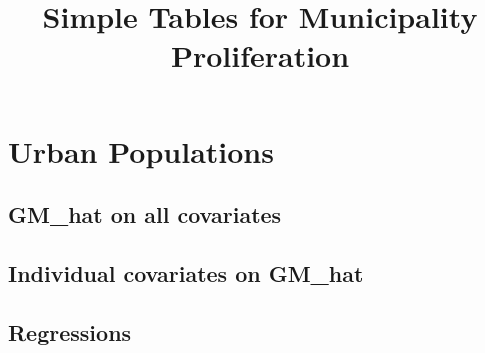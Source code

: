 \documentclass{article}
\title{Simple Tables for Municipality Proliferation}
\begin{document}
\maketitle
\tableofcontents
{\footnotesize 
\listoffigures
\listoftables}
\clearpage

\section{Urban Populations}
\subsection{GM\_hat on all covariates}

\clearpage
\subsection{Individual covariates on GM\_hat}

\clearpage
\subsection{Regressions}
\begin{landscape}

\clearpage

\clearpage
\clearpage

\clearpage

\clearpage
\end{landscape}
\end{document}
